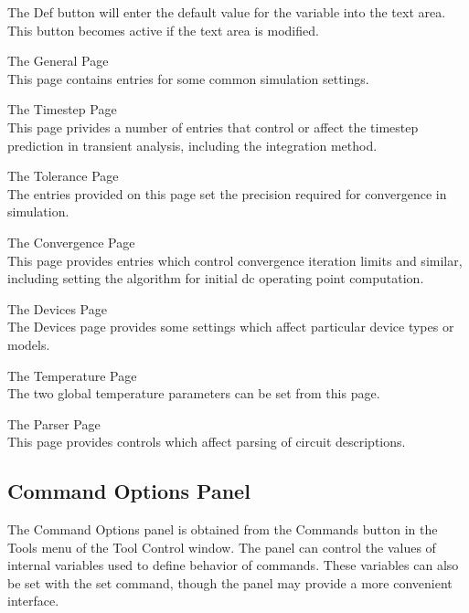 The {\cb Def} button will enter the default value for the variable
into the text area.  This button becomes active if the text area is
modified.

\begin{description}
\item{The {\cb General} Page}\\
This page contains entries for some common simulation settings.

\item{The {\cb Timestep} Page}\\
This page privides a number of entries that control or affect the
timestep prediction in transient analysis, including the integration
method.

\item{The {\cb Tolerance} Page}\\
The entries provided on this page set the precision required for
convergence in simulation.

\item{The {\cb Convergence} Page}\\
This page provides entries which control convergence iteration limits
and similar, including setting the algorithm for initial dc operating
point computation.

\item{The {\cb Devices} Page}\\
The {\cb Devices} page provides some settings which affect particular
device types or models.

\item{The {\cb Temperature} Page}\\
The two global temperature parameters can be set from this page.

\item{The {\cb Parser} Page}\\
This page provides controls which affect parsing of circuit
descriptions.
\end{description}

\subsection{Command Options Panel}
\label{cmdopts}

The {\cb Command Options} panel is obtained from the {\cb Commands}
button in the {\cb Tools} menu of the {\cb Tool Control} window.  The
panel can control the values of internal variables used to define
behavior of {\WRspice} commands.  These variables can also be set with
the {\cb set} command, though the panel may provide a more convenient
interface.


